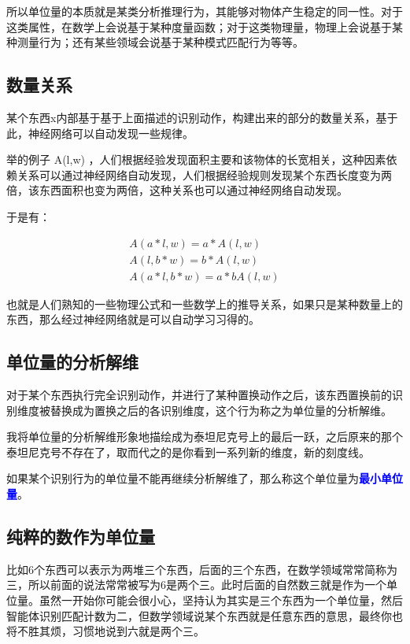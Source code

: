 \documentclass[12pt,oneside]{book}
\renewcommand{\emph}[1]{\textcolor{blue}{\textbf{#1}}}
\begin{document}
所以单位量的本质就是某类分析推理行为，其能够对物体产生稳定的同一性。对于这类属性，在数学上会说基于某种度量函数；对于这类物理量，物理上会说基于某种测量行为；还有某些领域会说基于某种模式匹配行为等等。


\subsection{数量关系}
某个东西x内部基于基于上面描述的识别动作，构建出来的部分的数量关系，基于此，神经网络可以自动发现一些规律。

\cite{烧掉数学书} 举的例子 A(l,w) ，人们根据经验发现面积主要和该物体的长宽相关，这种因素依赖关系可以通过神经网络自动发现，人们根据经验规则发现某个东西长度变为两倍，该东西面积也变为两倍，这种关系也可以通过神经网络自动发现。

于是有：

\begin{align*}
A(a*l, w) = a*A(l,w)\\
A(l, b*w) = b*A(l,w)\\
A(a*l, b*w) = a*b A(l, w) 
\end{align*}

也就是人们熟知的一些物理公式和一些数学上的推导关系，如果只是某种数量上的东西，那么经过神经网络就是可以自动学习习得的。



\subsection{单位量的分析解维}
对于某个东西执行完全识别动作，并进行了某种置换动作之后，该东西置换前的识别维度被替换成为置换之后的各识别维度，这个行为称之为单位量的分析解维。

我将单位量的分析解维形象地描绘成为泰坦尼克号上的最后一跃，之后原来的那个泰坦尼克号不存在了，取而代之的是你看到一系列新的维度，新的刻度线。

如果某个识别行为的单位量不能再继续分析解维了，那么称这个单位量为\emph{最小单位量}。

\subsection{纯粹的数作为单位量}
比如6个东西可以表示为两堆三个东西，后面的三个东西，在数学领域常常简称为三，所以前面的说法常常被写为6是两个三。此时后面的自然数三就是作为一个单位量。虽然一开始你可能会很小心，坚持认为其实是三个东西为一个单位量，然后智能体识别匹配计数为二，但数学领域说某个东西就是任意东西的意思，最终你也将不胜其烦，习惯地说到六就是两个三。
\end{document}
